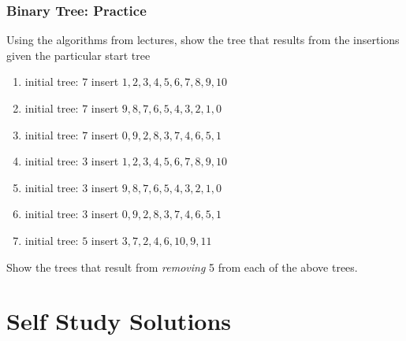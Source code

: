 \documentclass[twoside=false,DIV=14]{scrartcl}
\begin{document}
\section{Binary Tree: Practice}
Using the algorithms from lectures, show the tree that results from the insertions given the particular start tree
\begin{enumerate}
\item initial tree: $7$ insert $1,2,3,4,5,6,7,8,9,10$
\item initial tree: $7$ insert $9,8,7,6,5,4,3,2,1,0$
\item initial tree: $7$ insert $0,9,2,8,3,7,4,6,5,1$
\item initial tree: $3$ insert $1,2,3,4,5,6,7,8,9,10$
\item initial tree: $3$ insert $9,8,7,6,5,4,3,2,1,0$
\item initial tree: $3$ insert $0,9,2,8,3,7,4,6,5,1$
\item initial tree: $5$ insert $3,7,2,4,6,10,9,11$
\end{enumerate}
Show the trees that result from \emph{removing} 5 from each of the above trees.

\newpage\setcounter{section}{0}
\part*{Self Study Solutions}
\end{document}
